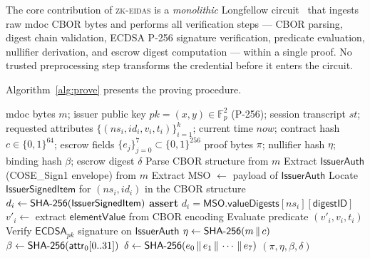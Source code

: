 The core contribution of \textsc{zk-eidas} is a \emph{monolithic} Longfellow circuit~\cite{longfellow} that ingests raw mdoc CBOR bytes and performs all verification steps --- CBOR parsing, digest chain validation, ECDSA P-256 signature verification, predicate evaluation, nullifier derivation, and escrow digest computation --- within a single proof.  No trusted preprocessing step transforms the credential before it enters the circuit.

Algorithm~\ref{alg:prove} presents the proving procedure.

\begin{algorithm}[t]
  \caption{$\mathsf{Prove}$: mdoc selective-disclosure proof generation}\label{alg:prove}
  \begin{algorithmic}[1]
    \Require mdoc bytes $m$; issuer public key $\mathit{pk} = (x,y) \in \mathbb{F}_p^2$ (P-256); session transcript $\mathit{st}$; requested attributes $\{(ns_i, id_i, v_i, t_i)\}_{i=1}^{k}$; current time $\mathit{now}$; contract hash $c \in \{0,1\}^{64}$; escrow fields $\{e_j\}_{j=0}^{7} \subset \{0,1\}^{256}$
    \Ensure proof bytes $\pi$; nullifier hash $\eta$; binding hash $\beta$; escrow digest $\delta$
    \Statex
    \State Parse CBOR structure from $m$
    \State Extract $\mathsf{IssuerAuth}$ (COSE\_Sign1 envelope) from $m$
    \State Extract MSO $\gets$ payload of $\mathsf{IssuerAuth}$
      \State Locate $\mathsf{IssuerSignedItem}$ for $(ns_i, id_i)$ in the CBOR structure
      \State $d_i \gets \mathsf{SHA\textnormal{-}256}(\mathsf{IssuerSignedItem})$
      \State \textbf{assert} $d_i = \mathsf{MSO.valueDigests}[ns_i][\mathsf{digestID}]$
      \State $v'_i \gets$ extract $\mathsf{elementValue}$ from CBOR encoding
      \State Evaluate predicate $(v'_i, v_i, t_i)$
    \EndFor
    \State Verify $\mathsf{ECDSA}_{pk}$ signature on $\mathsf{IssuerAuth}$
    \State $\eta \gets \mathsf{SHA\textnormal{-}256}(m \,\|\, c)$
    \State $\beta \gets \mathsf{SHA\textnormal{-}256}(\mathsf{attr}_0[0..31])$
    \State $\delta \gets \mathsf{SHA\textnormal{-}256}(e_0 \,\|\, e_1 \,\|\, \cdots \,\|\, e_7)$
    \State \Return $(\pi, \eta, \beta, \delta)$
  \end{algorithmic}
\end{algorithm}


